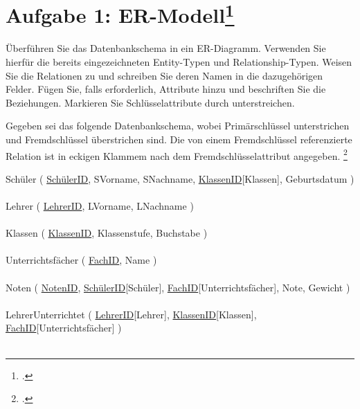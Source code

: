\documentclass{lehramt-informatik-aufgabe}
\begin{document}
\section{Aufgabe 1: ER-Modell\footcite{db:pu:wh}}

\def\TmpUeber#1{{\setul{-0.9em}{}\ul{#1}}}

Überführen Sie das Datenbankschema in ein
ER-Diagramm. Verwenden Sie hierfür die
bereits eingezeichneten Entity-Typen und Relationship-Typen. Weisen Sie
die Relationen zu und schreiben Sie deren Namen
in die dazugehörigen Felder. Fügen Sie, falls erforderlich, Attribute
hinzu und beschriften Sie die Beziehungen. Markieren Sie
Schlüsselattribute durch unterstreichen.

Gegeben sei das folgende Datenbankschema, wobei Primärschlüssel
unterstrichen und Fremdschlüssel überstrichen sind. Die von einem
Fremdschlüssel referenzierte Relation ist in eckigen Klammem nach dem
Fremdschlüsselattribut angegeben.
\footcite[DB/ST - Herbst 2018 (nicht vertieft - 46116), Thema 2 Teilaufgabe 2 Aufgabe 5]{examen:46116:2018:09}

\bigskip

{
  \noindent
  \ttfamily
  \footnotesize
  Schüler (%
    \ul{SchülerID},
    SVorname,
    SNachname,
    \TmpUeber{KlassenID}[Klassen],
    Geburtsdatum%
  )\\\\
  Lehrer (%
    \ul{LehrerID},
    LVorname,
    LNachname%
  )\\\\
  Klassen (%
    \ul{KlassenID},
    Klassenstufe,
    Buchstabe%
  )\\\\
  Unterrichtsfächer (%
    \ul{FachID},
    Name%
  )\\\\
  Noten (%
    \ul{NotenID},
    \TmpUeber{SchülerID}[Schüler],
    \TmpUeber{FachID}[Unterrichtsfächer],
    Note,
    Gewicht%
  )\\\\
  LehrerUnterrichtet (%
    \TmpUeber{LehrerID}[Lehrer],
    \ul{KlassenID}[Klassen],
    \ul{FachID}[Unterrichtsfächer]%
  )\\\\
}

\begin{center}
\end{center}
\end{document}
